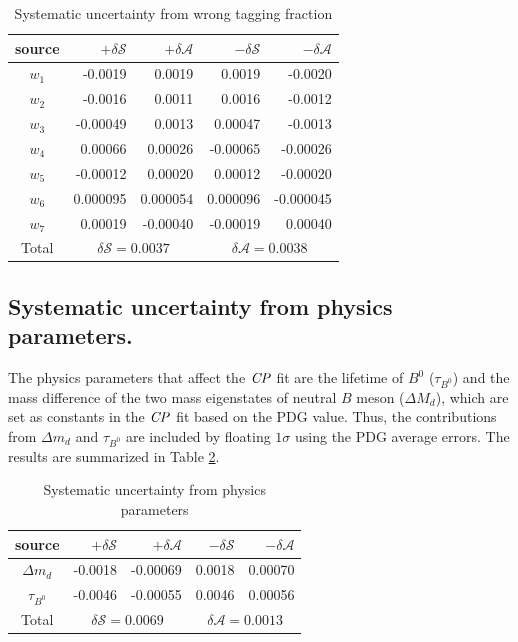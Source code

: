 \begin{table}[htpb]
\begin{minipage}[b]{1.0\linewidth}
\centering
\caption{Systematic uncertainty from wrong tagging fraction}
\label{tab:sy_wtag}
\begin{tabular}{c r r r r}
\hline
source & $+\delta \mathcal{S}$ & $+\delta \mathcal{A}$ & $-\delta \mathcal{S}$ &  $-\delta \mathcal{A}$\\
\hline
$w_1$ & -0.0019
& 0.0019
& 0.0019
& -0.0020
\\
$ w_2$ & -0.0016
& 0.0011
& 0.0016
& -0.0012
\\
$ w_3$ & -0.00049
& 0.0013
& 0.00047
& -0.0013
\\
$ w_4$ & 0.00066
& 0.00026
& -0.00065
& -0.00026\\
$ w_5$ & -0.00012
& 0.00020
& 0.00012 &
-0.00020
\\
$ w_6$ & 0.000095 & 0.000054 & 0.000096 & -0.000045 \\
$ w_7$ & 0.00019
& -0.00040
& -0.00019
& 0.00040
\\
\hline
Total &
\multicolumn{2}{c}{$\delta \mathcal{S}=0.0037$} &
\multicolumn{2}{c}{$\delta \mathcal{A}=0.0038$}\\
\hline
\end{tabular}
\end{minipage}
\end{table}


\subsection{Systematic uncertainty from physics parameters.}
The physics parameters that affect the $\it{CP}$ fit are the lifetime of $B^0$ ($\tau_{B^0}$) and the mass difference of the two mass eigenstates of neutral $B$ meson ($\Delta M_d$), which are set as constants in the $\it{CP}$ fit based on the PDG value.
Thus, the contributions from $\Delta m_d$ and $\tau_{B^0}$ are included by floating $1\sigma$ using the PDG average errors. The results are summarized in Table \ref{tab:sy_phys}.
\begin{table}[htpb]
	\begin{minipage}[b]{1.0\linewidth}
		\centering
		\caption{Systematic uncertainty from  physics parameters}
		\label{tab:sy_phys}
		\begin{tabular}{c r r r r}
			\hline
			source & $+\delta \mathcal{S}$ & $+\delta \mathcal{A}$ & $-\delta \mathcal{S}$ &  $-\delta \mathcal{A}$\\
			\hline
			$\Delta m_d$  & -0.0018
			& -0.00069
			& 0.0018
			& 0.00070
			\\
			$\tau_{B^0}$  & -0.0046
			& -0.00055
			& 0.0046
			& 0.00056
			\\
			\hline
			Total &
			\multicolumn{2}{c}{$\delta \mathcal{S}=0.0069$} &
			\multicolumn{2}{c}{$\delta \mathcal{A}=0.0013$}\\
			\hline
		\end{tabular}
	\end{minipage}
\end{table}


